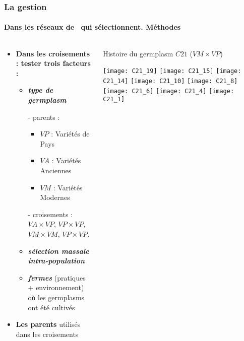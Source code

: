 \begin{frame}
\frametitle{La gestion \insitu}
\framesubtitle{Dans les réseaux de \MSPs~qui sélectionnent. Méthodes}

\begin{columns}

\begin{column}{.6\textwidth}
\begin{itemize}
\item \textbf{Dans les croisements : tester trois facteurs : }

\begin{itemize}
\item<1-> \textit{\textbf{type de germplasm}}

 - parents : 
\begin{itemize}
\item $VP$ : Variétés de Pays
\item $VA$ : Variétés Anciennes
\item $VM$ : Variétés Modernes
\end{itemize}
- croisements :
$VA \times VP$,
$VP \times VP$,
$VM \times VM$,
$VP \times VP$.

\item<2-> \textit{\textbf{sélection massale intra-population}}
\item<8-> \textit{\textbf{fermes}} (pratiques + environnement) où les germplasms ont été cultivés

\end{itemize}
\item<9-> \textbf{Les parents} utilisés dans les croisements %

\end{itemize}

\end{column}


\begin{column}{.45\textwidth}

\begin{center}
\small Histoire du germplasm $C21$  ($VM \times VP$)
 \begin{overprint}
 \texttt{[image: C21\_19]}
 \texttt{[image: C21\_15]}
 \texttt{[image: C21\_14]}
 \texttt{[image: C21\_10]} 
 \texttt{[image: C21\_8]} 
 \texttt{[image: C21\_6]} 
 \texttt{[image: C21\_4]} 
 \texttt{[image: C21\_1]}
 \end{overprint}
\end{center}

\end{column}

\end{columns}

\end{frame}



